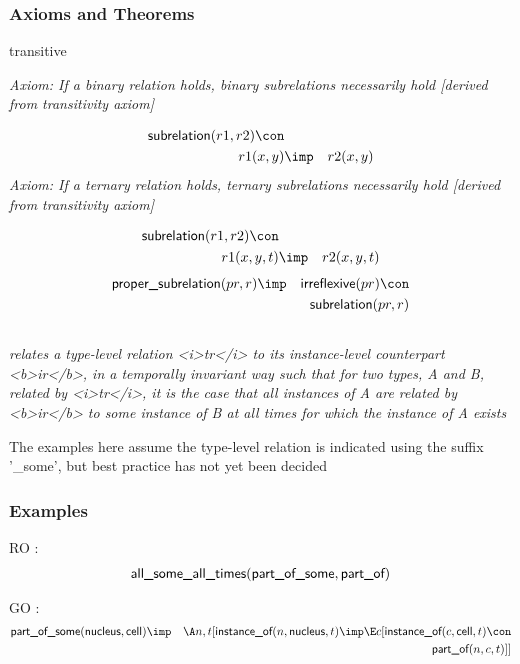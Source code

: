 \subsubsection{Axioms and Theorems}

\begin{clist}
\item transitive
\end{clist}

\emph{Axiom: If a binary relation holds, binary subrelations necessarily hold [derived from transitivity axiom]}

\begin{eqnarray*}
 \pr{subrelation}(r1, r2) \con \\
r1(x, y) &\imp &r2(x, y) 
\end{eqnarray*}
\emph{Axiom: If a ternary relation holds, ternary subrelations necessarily hold [derived from transitivity axiom]}

\begin{eqnarray*}
 \pr{subrelation}(r1, r2) \con \\
r1(x, y, t) &\imp &r2(x, y, t) 
\end{eqnarray*}
\begin{eqnarray*}
 \pr{proper\_subrelation}(pr, r) &\imp & \pr{irreflexive}(pr) \con \\
&& \pr{subrelation}(pr, r) 
\end{eqnarray*}

\subsection{ }
\emph{relates a type-level relation <i>tr</i> to its instance-level counterpart <b>ir</b>, in a temporally invariant way such that for two types, A and B, related by <i>tr</i>, it is the case that all instances of A are related by <b>ir</b> to some instance of B at all times for which the instance of A exists}

The examples here assume the type-level relation is indicated using the suffix '\_some', but best practice has not yet been decided

\subsubsection{Examples}
\begin{clist}
\item RO : \begin{eqnarray*}
 \mbox{\sf all\_some\_all\_times}( \mbox{\sf part\_of\_some},  \mbox{\sf part\_of}) 
\end{eqnarray*}

\item GO : \begin{eqnarray*}
 \pr{part\_of\_some}( \pr{nucleus},  \pr{cell}) &\imp & \A n, t[ \pr{instance\_of}(n,  \pr{nucleus}, t) \imp  \E c[ \pr{instance\_of}(c,  \pr{cell}, t) \con \\
&& \pr{part\_of}(n, c, t) ]]
\end{eqnarray*}

\end{clist}

